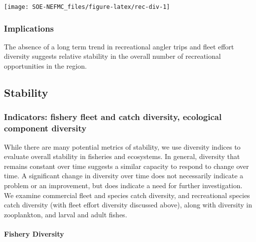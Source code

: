 \documentclass[
  10pt,
]{article}
\let\origfigure\figure
\let\endorigfigure\endfigure
\renewenvironment{figure}[1][2] {
    \expandafter\origfigure\expandafter[H]
} {
    \endorigfigure
}
\begin{document}
\begin{figure}

{\centering \texttt{[image: SOE-NEFMC\_files/figure-latex/rec-div-1]} 

}

\caption{Recreational fleet effort diversity in New England.}\label{fig:rec-div}
\end{figure}

\hypertarget{implications-2}{%
\subsubsection{Implications}\label{implications-2}}

The absence of a long term trend in recreational angler trips and fleet effort diversity suggests relative stability in the overall number of recreational opportunities in the region.

\hypertarget{stability}{%
\subsection{Stability}\label{stability}}

\hypertarget{indicators-fishery-fleet-and-catch-diversity-ecological-component-diversity}{%
\subsubsection{Indicators: fishery fleet and catch diversity, ecological component diversity}\label{indicators-fishery-fleet-and-catch-diversity-ecological-component-diversity}}

While there are many potential metrics of stability, we use diversity indices to evaluate overall stability in fisheries and ecosystems. In general, diversity that remains constant over time suggests a similar capacity to respond to change over time. A significant change in diversity over time does not necessarily indicate a problem or an improvement, but does indicate a need for further investigation. We examine commercial fleet and species catch diversity, and recreational species catch diversity (with fleet effort diversity discussed above), along with diversity in zooplankton, and larval and adult fishes.

\hypertarget{fishery-diversity}{%
\paragraph{Fishery Diversity}\label{fishery-diversity}}
\end{document}
